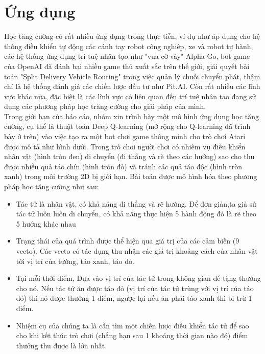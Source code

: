 \documentclass[14pt,a4paper,oneside]{report}		%
\begin{document}
\chapter{Ứng dụng}
	Học tăng cường có rất nhiều ứng dụng trong thực tiễn, ví dụ như áp dụng cho hệ thống điều khiển tự động các cánh tay robot công nghiêp, xe và robot tự hành, các hệ thống ứng dụng trí tuệ nhân tạo như "vua cờ vây" Alpha Go, bot game của OpenAI đã đánh bại nhiều game thủ xuất sắc trên thế giới, giải quyết bài toán "Split Delivery Vehicle Routing" trong việc quản lý chuỗi chuyển phát, thậm chí là hệ thống đánh giá các chiến lược đầu tư như Pit.AI. Còn rất nhiều các lĩnh vực khác nữa, đặc biệt là các lĩnh vực có liên quan đến trí tuệ nhân tạo đang sử dụng các phương pháp học trăng cường cho giải pháp của mình.\\
	Trong giới hạn của báo cáo, nhóm xin trình bày một mô hình ứng dụng học tăng cường, cụ thể là thuật toán Deep Q-learning (mở rộng cho Q-learning đã trình bày ở trên) vào việc tạo ra một bot chơi game thông minh cho trò chơi Atari được mô tả như hình dưới. Trong trò chơi người chơi có nhiêm vụ điều khiển nhân vật (hình tròn đen) di chuyển (đi thẳng và rẽ theo các hướng) sao cho thu được nhiều quả táo chín (hình tròn đỏ) và tránh các quả táo độc (hình tròn xanh) trong môi trường 2D bị giới hạn. Bài toán được mô hình hóa theo phương pháp học tăng cường như sau:
\begin{itemize}
\item Tác tử là nhân vật, có khả năng đi thẳng và rẽ hướng. Để đơn giản,ta giả sử tác tử luôn luôn di chuyển, có khả năng thực hiện 5 hành động đó là rẽ theo 5 hướng khác nhau
\item Trạng thái của quá trình được thể hiện qua giá trị của các cảm biến (9 vecto). Các vecto có tác dụng thu nhận các giá trị khoảng cách của nhân vật tới vị trí của tường, táo xanh, táo đỏ.
\item Tại mỗi thời điểm, Dựa vào vị trí của tác tử trong không gian để tặng thưởng cho nó. Nếu tác tử ăn được táo đỏ (vị trí của tác tử trùng với vị trí của táo đỏ) thì nó được thưởng 1 điểm, ngược lại nếu ăn phải táo xanh thì bị trừ 1 điểm.
\item Nhiệm cụ của chúng ta là cần tìm một chiến lược điều khiển tác tử để sao cho khi kết thúc trò chơi (chẳng hạn sau 1 khoảng thời gian nào đó) điểm thưởng thu được là lớn nhất.
\end{itemize}
\end{document}
